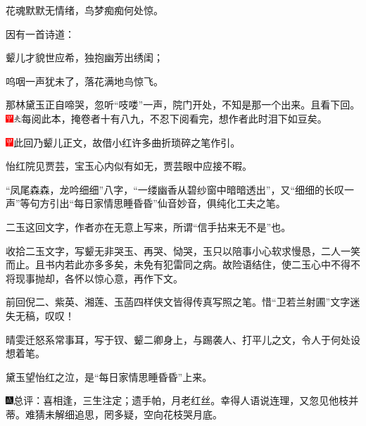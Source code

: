 花魂默默无情绪，鸟梦痴痴何处惊。

因有一首诗道：

颦儿才貌世应希，独抱幽芳出绣闺；

呜咽一声犹未了，落花满地鸟惊飞。

那林黛玉正自啼哭，忽听``吱喽''一声，院门开处，不知是那一个出来。且看下回。{\includegraphics[width=3mm]{../Images/00002}\includegraphics[width=3mm]{../Images/00012}\footnotesize \kaishu 每阅此本，掩卷者十有八九，不忍下阅看完，想作者此时泪下如豆矣。}

\includegraphics[width=3mm]{../Images/00002}{此回乃颦儿正文，故借小红许多曲折琐碎之笔作引。}

{怡红院见贾芸，宝玉心内似有如无，贾芸眼中应接不暇。}

{``凤尾森森，龙吟细细''八字，``一缕幽香从碧纱窗中暗暗透出''，又``细细的长叹一声''等句方引出``每日家情思睡昏昏''仙音妙音，俱纯化工夫之笔。}

{二玉这回文字，作者亦在无意上写来，所谓``信手拈来无不是''也。}

{收拾二玉文字，写颦无非哭玉、再哭、恸哭，玉只以陪事小心软求慢恳，二人一笑而止。且书内若此亦多多矣，未免有犯雷同之病。故险语结住，使二玉心中不得不将现事抛却，各怀以惊心意，再作下文。}

{前回倪二、紫英、湘莲、玉菡四样侠文皆得传真写照之笔。惜``卫若兰射圃''文字迷失无稿，叹叹！}

{晴雯迁怒系常事耳，写于钗、颦二卿身上，与踢袭人、打平儿之文，令人于何处设想着笔。}

{黛玉望怡红之泣，是``每日家情思睡昏昏''上来。}

{\includegraphics[width=3mm]{../Images/00005}总评：喜相逢，三生注定；遗手帕，月老红丝。幸得人语说连理，又忽见他枝并蒂。难猜未解细追思，罔多疑，空向花枝哭月底。}
